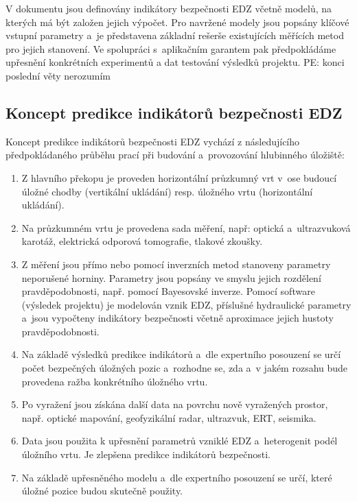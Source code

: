 \documentclass{article}
\newcommand{\pe}[1]{{\color{orange} PE: #1}}
\begin{document}
V dokumentu jsou definovány indikátory bezpečnosti EDZ včetně modelů, na kterých 
má být založen jejich výpočet. Pro navržené modely jsou popsány klíčové vstupní 
parametry a~je představena základní rešerše existujících měřících metod pro jejich
stanovení. Ve spolupráci s~aplikačním garantem pak předpokládáme upřesnění konkrétních experimentů
a dat testování výsledků projektu. \pe{konci poslední věty nerozumím}


\subsection{Koncept predikce indikátorů bezpečnosti EDZ}



Koncept predikce indikátorů bezpečnosti EDZ vychází z následujícího předpokládaného průběhu prací 
při budování a~provozování hlubinného úložiště:
\begin{enumerate}
    \item Z hlavního překopu je proveden horizontální průzkumný vrt v~ose budoucí úložné chodby
        (vertikální ukládání) resp. úložného vrtu (horizontální ukládání).
    \item Na průzkumném vrtu je provedena sada měření, 
          např: optická a~ultrazvuková karotáž, elektrická odporová tomografie, tlakové zkoušky.

    \item \label{item_model1}
        Z měření jsou přímo nebo pomocí inverzních metod stanoveny parametry neporušené horniny.
        Parametry jsou popsány ve smyslu jejich rozdělení pravděpodobnosti, 
        např. pomocí Bayesovské inverze. Pomocí software (výsledek projektu) je modelován vznik EDZ,
        příslušné hydraulické parametry a~jsou vypočteny indikátory bezpečnosti včetně aproximace 
        jejich hustoty pravděpodobnosti.
    \item Na základě výsledků predikce indikátorů a~dle expertního posouzení se určí počet bezpečných
        úložných pozic a~rozhodne se, zda a~v jakém rozsahu bude provedena ražba  konkrétního úložného vrtu.
    \item Po vyražení jsou získána další data na povrchu nově vyražených prostor, např. optické mapování, 
        geofyzikální radar, ultrazvuk, ERT, seismika. 
    \item Data jsou použita k upřesnění parametrů vzniklé EDZ a~heterogenit podél úložního vrtu. 
        Je zlepšena predikce indikátorů bezpečnosti.  
    \item \label{item_model2}
        Na základě upřesněného modelu a~dle expertního posouzení se určí, které úložné pozice budou 
        skutečně použity.
\end{enumerate}
\end{document}
